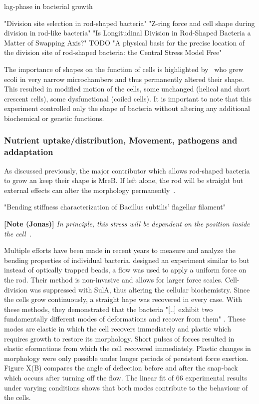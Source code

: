 \documentclass{article}
\begin{document}
\cite{Bertrand2019} lag-phase in bacterial growth

\cite{Bramkamp2009} "Division site selection in rod-shaped bacteria"
\cite{Lan2007} "Z-ring force and cell shape during division in rod-like bacteria"
\cite{denBlaauwen2018} "Is Longitudinal Division in Rod-Shaped Bacteria a Matter of Swapping Axis?"
\cite{Koch1995} TODO "A physical basis for the precise location of the division site of rod-shaped bacteria: the Central Stress Model Free"


The importance of shapes on the function of cells is highlighted by~\cite{Takeuchi2005} who grew
\ac{ecoli} in very narrow microchambers and thus permanently altered their shape.
This resulted in modified motion of the cells, some unchanged (helical and short crescent cells),
some dysfunctional (coiled cells).
It is important to note that this experiment controlled only the shape of bacteria without altering
any additional biochemical or genetic functions.

\subsubsection{Nutrient uptake/distribution, Movement, pathogens and addaptation} %

As discussed previously, the major contributor which allows rod-shaped bacteria to grow an keep their shape is MreB.
If left alone, the rod will be straight but external effects can alter the morphology permanently~\cite{Takeuchi2005}.

\cite{Shen2022} "Bending stiffness characterization of Bacillus subtilis’ flagellar filament"

\textbf{[Note (Jonas)]} \textit{In principle, this stress will be dependent on the position inside the cell~\cite{Chatterjee1988}.}

Multiple efforts have been made in recent years to measure and analyze the bending properties of individual bacteria.
\cite{Amir2014_2} designed an experiment similar to \cite{Wang2010,Wang2010_protocol} but instead of optically trapped beads, a flow was used to apply a uniform force on the rod.
Their method is non-invasive and allows for larger force scales.
Cell-division was suppressed with SulA, thus altering the cellular biochemistry.
Since the cells grow continuously, a straight  hape was recovered in every case.
With these methods, they demonstrated that the bacteria "[..] exhibit two fundamentally different modes of deformations and recover from them" \cite{Amir2014_2}.
These modes are elastic in which the cell recovers immediately and plastic which requires growth to restore its morphology.
Short pulses of forces resulted in elastic  eformations from which the cell recovered immediately.
Plastic changes in morphology were only possible under longer periods of persistent force exertion.
Figure X(B) compares the angle  of deflection before and after the snap-back which occurs after turning off the flow.
The linear fit of 66 experimental results under varying conditions shows that both modes contribute to the behaviour of the cells.
\end{document}
